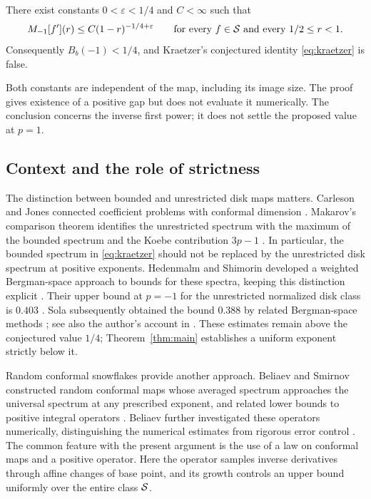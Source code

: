 \begin{theorem}\label{thm:main}
There exist constants \(0<\varepsilon<1/4\) and \(C<\infty\) such that
\begin{equation}\label{eq:uniform}
 M_{-1}[f'](r)\le C(1-r)^{-1/4+\varepsilon}
 \qquad\text{for every }f\in\mathcal S\text{ and every }1/2\le r<1.
\end{equation}
Consequently \(B_b(-1)<1/4\), and Kraetzer's conjectured identity
\eqref{eq:kraetzer} is false.
\end{theorem}

Both constants are independent of the map, including its image size.
The proof gives existence of a positive gap but does not evaluate it
numerically. The conclusion concerns the inverse first power; it does
not settle the proposed value at \(p=1\).

\subsection{Context and the role of strictness}

The distinction between bounded and unrestricted disk maps matters.
Carleson and Jones connected coefficient problems with conformal
dimension \cite{CJ}. Makarov's comparison theorem identifies the
unrestricted spectrum with the maximum of the bounded spectrum and
the Koebe contribution \(3p-1\) \cite[Theorem 5.4]{Makarov}.
In particular, the bounded spectrum in \eqref{eq:kraetzer} should
not be replaced by the unrestricted disk spectrum at positive exponents.
Hedenmalm and Shimorin developed a weighted Bergman-space approach
to bounds for these spectra, keeping this distinction explicit
\cite{HedenmalmShimorin}. Their upper bound at \(p=-1\) for the
unrestricted normalized disk class is \(0.403\)
\cite[Table 1]{HedenmalmShimorin}. Sola subsequently obtained the
bound \(0.388\) by related Bergman-space methods
\cite{Sola}; see also the author's account in
\cite[p.~6]{SolaThesis}. These estimates remain above the
conjectured value \(1/4\); Theorem~\ref{thm:main} establishes a
uniform exponent strictly below it.

Random conformal snowflakes provide another approach. Beliaev and
Smirnov constructed random conformal maps whose averaged spectrum
approaches the universal spectrum at any prescribed exponent, and
related lower bounds to positive integral operators
\cite[Sections 3--4]{BeliaevSmirnov}. Beliaev further investigated
these operators numerically, distinguishing the numerical estimates
from rigorous error control \cite{Beliaev}. The common feature with
the present argument is the use of a law on conformal maps and a
positive operator. Here the operator samples inverse derivatives
through affine changes of base point, and its growth controls an
upper bound uniformly over the entire class \(\mathcal S\).

